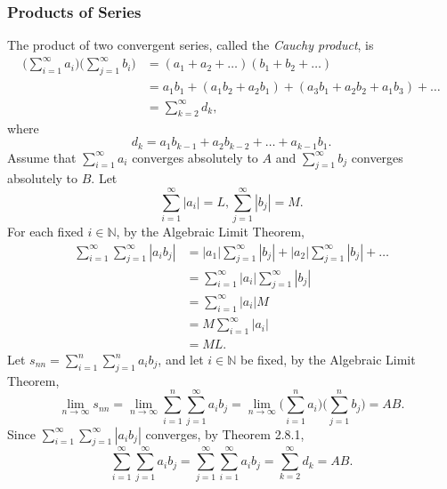 \documentclass{article}
\begin{document}
            \subsubsection{Products of Series}
            The product of two convergent series, called the \textit{Cauchy product}, is
            \begin{align*}
                \Bigg(\sum_{i=1}^\infty a_i\Bigg) \Bigg(\sum_{j=1}^\infty b_i\Bigg) & = (a_1 + a_2 + \dots)(b_1 + b_2 + \dots) \\
                & = a_1b_1 + (a_1b_2 + a_2b_1) + (a_3b_1 + a_2b_2 + a_1b_3) + \dots \\
                & = \sum_{k=2}^\infty d_k,
            \end{align*}
            where
            \begin{equation*}
                d_k = a_1b_{k-1}+a_2b_{k-2}+\dots+a_{k-1}b_1.
            \end{equation*}
            Assume that $\sum_{i=1}^\infty a_i$ converges absolutely to $A$ and $\sum_{j=1}^\infty b_j$ converges absolutely to $B$. Let
            \begin{equation*}
                \sum_{i=1}^\infty |a_i| = L, \sum_{j=1}^\infty |b_j| = M.
            \end{equation*}
            For each fixed $i \in \mathbb{N}$, by the Algebraic Limit Theorem,
            \begin{align*}
                \sum_{i=1}^\infty \sum_{j=1}^\infty |a_ib_j| & = |a_1|  \sum_{j=1}^\infty |b_j| + |a_2|  \sum_{j=1}^\infty |b_j| + \dots \\
                & = \sum_{i=1}^\infty |a_i|  \sum_{j=1}^\infty |b_j| \\
                & = \sum_{i=1}^\infty |a_i|M \\
                & = M\sum_{i=1}^\infty |a_i| \\
                & = ML.
            \end{align*}
            Let $s_{nn}=\sum_{i=1}^n \sum_{j=1}^n a_ib_j$, and let $i \in \mathbb{N}$ be fixed, by the Algebraic Limit Theorem,
            \begin{equation*}
                \lim_{n \to \infty} s_{nn} = \lim_{n \to \infty} \sum_{i=1}^n \sum_{j=1}^\infty a_ib_j =\lim_{n \to \infty} \Bigg(\sum_{i=1}^n a_i \Bigg) \Bigg(\sum_{j=1}^n b_j \Bigg) = AB.
            \end{equation*}
            Since $\sum_{i=1}^\infty \sum_{j=1}^\infty |a_ib_j|$ converges, by Theorem 2.8.1,
            \begin{equation*}
                \sum_{i=1}^\infty \sum_{j=1}^\infty a_ib_j = \sum_{j=1}^\infty \sum_{i=1}^\infty a_ib_j = \sum_{k=2}^\infty d_k = AB.
            \end{equation*}\\ \\
            
\end{document}
